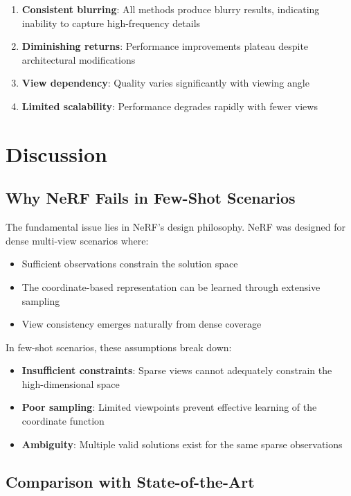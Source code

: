 \documentclass[11pt]{article}
\begin{document}
\begin{enumerate}
    \item \textbf{Consistent blurring}: All methods produce blurry results, indicating inability to capture high-frequency details
    \item \textbf{Diminishing returns}: Performance improvements plateau despite architectural modifications
    \item \textbf{View dependency}: Quality varies significantly with viewing angle
    \item \textbf{Limited scalability}: Performance degrades rapidly with fewer views
\end{enumerate}

\section{Discussion}

\subsection{Why NeRF Fails in Few-Shot Scenarios}

The fundamental issue lies in NeRF's design philosophy. NeRF was designed for dense multi-view scenarios where:
\begin{itemize}
    \item Sufficient observations constrain the solution space
    \item The coordinate-based representation can be learned through extensive sampling
    \item View consistency emerges naturally from dense coverage
\end{itemize}

In few-shot scenarios, these assumptions break down:
\begin{itemize}
    \item \textbf{Insufficient constraints}: Sparse views cannot adequately constrain the high-dimensional space
    \item \textbf{Poor sampling}: Limited viewpoints prevent effective learning of the coordinate function
    \item \textbf{Ambiguity}: Multiple valid solutions exist for the same sparse observations
\end{itemize}

\subsection{Comparison with State-of-the-Art}
\end{document}
